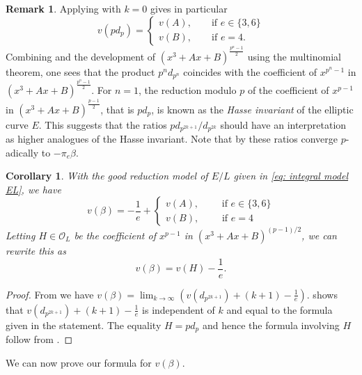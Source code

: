 \documentclass{amsart}
\newtheorem{corollary}[theorem]{Corollary}
\theoremstyle{definition}
\newtheorem{remark}[theorem]{Remark}
\numberwithin{theorem}{section}
\numberwithin{equation}{section}
\begin{document}
\begin{remark}\label{rmk: relation to Hasse invariant}
    Applying  with $k=0$ gives in particular
    \[
    v(pd_p)=
    \begin{cases}
        v(A), \qquad \text{if $e \in \{3,6\}$} \\
        v(B), \qquad \text{if $e=4$}.
    \end{cases}
    \]
    Combining  and the development of $(x^3+Ax+B)^{\frac{p^n-1}{2}}$ using the multinomial theorem, one sees that the product $p^n d_{p^n}$ coincides with the coefficient of $x^{p^n-1}$ in $\left( x^3+Ax+B \right)^{\frac{p^n-1}{2}}$. For $n=1$, the reduction modulo $p$ of the coefficient of $x^{p-1}$ in $\left( x^3+Ax+B \right)^{\frac{p-1}{2}}$, that is $pd_p$, is known as the \textit{Hasse invariant} of the elliptic curve $E$. This suggests that the ratios $p d_{p^{2k+1}}/d_{p^{2k}}$ should have an interpretation as higher analogues of the Hasse invariant. Note that by  these ratios converge $p$-adically to $-\pi_e \beta$.
\end{remark}


\begin{corollary}\label{cor: formula for valuation beta}
    With the good reduction model of $E/L$ given in \eqref{eq: integral model EL}, we have 
    \[
    v(\beta) = -\frac{1}{e} + \begin{cases}
        v(A), \qquad \text{ if }e \in \{3,6\}\\
        v(B), \qquad \text{ if }e =4
    \end{cases}
    \]
    Letting $H \in \mathcal{O}_L$ be the coefficient of $x^{p-1}$ in $(x^3+Ax+B)^{(p-1)/2}$, we can rewrite this as
    \[
    v(\beta) = v(H) - \frac{1}{e}.
    \]
\end{corollary}

\begin{proof}
    From  we have $v(\beta) = \lim_{k \to \infty} \left(v(d_{p^{2k+1}}) + (k+1) - \frac{1}{e}\right)$.
     shows that $v(d_{p^{2k+1}}) + (k+1) - \frac{1}{e}$ is independent of $k$ and equal to the formula given in the statement. The equality $H=pd_p$ and hence the formula involving $H$ follow from .
\end{proof}

We can now prove our formula for $v(\beta)$.
\end{document}
